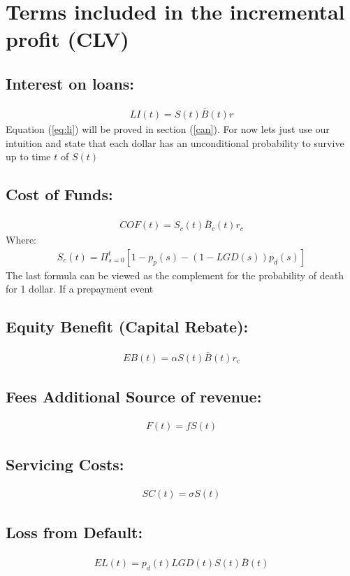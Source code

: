 \section{ Terms included in the incremental profit (CLV)}
\subsection{ Interest on loans: }
\begin{align}
LI(t) = S(t)\bar{ B}(t)r \label{eq:li}
\end{align}
Equation (\ref{eq:li}) will be proved in section (\ref{can}). For now lets just use our intuition and state that each dollar has an unconditional probability to survive up to time $t$ of $S(t)$ 
\subsection{  Cost of Funds: }
\begin{align}
COF(t) = S_c(t)\bar{ B}_c(t)r_c
\end{align}
Where: 
\begin{align}
S_c(t)= \Pi_{s=0}^t [1- p_p(s)-(1-LGD(s))p_d(s) ]
\end{align}
The last formula can be viewed as the complement for the probability of death for 1 dollar. If a prepayment event 

\subsection{ Equity Benefit (Capital Rebate): }
\begin{align}
EB(t) = \alpha S(t)\bar{ B}(t) r_c
\end{align}

\subsection{ Fees Additional Source of revenue: }
\begin{align}
F(t) = f S(t)
\end{align}

\subsection{ Servicing Costs: }
\begin{align}
SC(t) =  \sigma S(t)
\end{align}

\subsection{ Loss from Default: }
\begin{align}
EL(t) =  p_d(t)LGD(t)S(t)\bar{ B}(t) 
\end{align}
